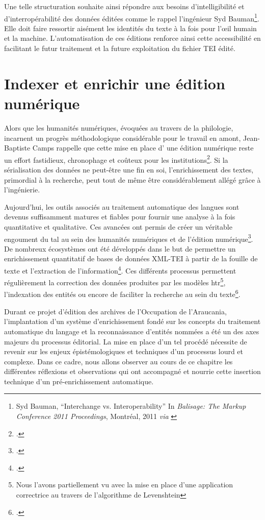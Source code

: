 	Une telle structuration souhaite ainsi répondre aux besoins d'intelligibilité et d'interropérabilité des données éditées comme le rappel l'ingénieur Syd Bauman\footnote{Syd Bauman, \enquote{Interchange vs. Interoperability} In \textit{Balisage: The Markup Conference 2011 Proceedings}, Montréal, 2011 \textit{via} \cite{munozTextsDocumentsNew2014}}. Elle doit faire ressortir aisément les identités du texte à la fois pour l'œil  humain et la machine. L'automatisation de ces éditions renforce ainsi cette accessibilité en facilitant le futur traitement et la future exploitation du fichier TEI édité.
	
	\chapter{Indexer et enrichir une édition numérique}
	
	Alors que les humanités numériques, évoquées au travers de la philologie, incarnent un progrès méthodologique considérable pour le travail en amont, Jean-Baptiste Camps rappelle que cette mise en place d' une édition numérique reste un effort fastidieux, chronophage et coûteux pour les institutions\footcite{campsOuVaPhilologie2018}. Si la sérialisation des données ne peut-être une fin en soi, l'enrichissement des textes, primordial à la recherche, peut tout de même être considérablement allégé grâce à l'ingénierie.
	
	Aujourd'hui, les outils associés au traitement automatique des langues sont devenus suffisamment matures et fiables pour fournir une analyse à la fois quantitative et qualitative. Ces avancées ont permis de créer un véritable engoument du \gls{tal} au sein des humanités numériques et de l'édition numérique\footcite{mcgillivrayDigitalHumanitiesNatural2020}. De nombreux écosystèmes ont été développés dans le but de permettre un enrichissement quantitatif de bases de données XML-TEI à partir de la fouille de texte et l'extraction de l'information\footcite{bissonNoticesAutoriteXMLTEI2020}. Ces différents processus permettent régulièrement la correction des données produites par les modèles \gls{htr}\footnote{Nous l'avons partiellement vu avec la mise en place d'une application correctrice au travers de l'algorithme de Levenshtein}, l'indexation des entités ou encore de faciliter la recherche au sein du texte\footcite{terrielRepresenterEvaluerDonnees2020}.
	
	Durant ce projet d'édition des archives de l'Occupation de l'Araucania, l'implantation d'un système d'enrichissement fondé sur les concepts du traitement automatique du langage et la reconnaissance d’entités nommées a été un des axes majeurs du processus éditorial. La mise en place d'un tel procédé nécessite de revenir sur les enjeux épistémologiques et techniques d'un processus lourd et complexe. Dans ce cadre, nous allons observer au cours de ce chapitre les différentes réflexions et observations qui ont accompagné et nourrie cette insertion technique d'un pré-enrichissement automatique.
	
